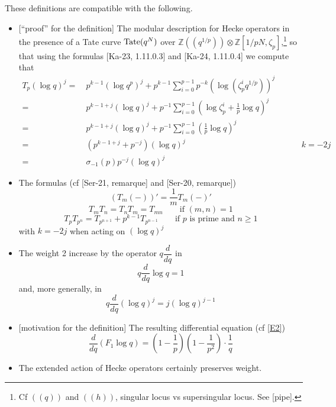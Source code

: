\documentclass{rs}
\theoremstyle{definition}
\theoremstyle{remark}
\newcommand{\mb}[1]{\mathbb{#1}}
\newcommand{\BZ}{{\mb Z}}
\newcommand{\si}{\sigma}
\newcommand{\lp}{(\!(}
\newcommand{\rp}{)\!)}
\renewcommand{\=}{\approx}
\renewcommand{\-}{\sim}
\newcommand{\Tate}{{\rm Tate}}
\numberwithin{equation}{section}
\numberwithin{thm}{section}
\begin{document}
These definitions are compatible with the following.  
\begin{itemize}
 \item {[``proof'' for the definition]} The modular description for Hecke operators in the presence of a Tate curve 
 $\Tate(q^N)$ over $\BZ \lp q^{1 / p} \rp \otimes \BZ [1 / p N, \zeta_p]$,\footnote{Cf 
 $\lp q \rp$ and $\lp h \rp$, singular locus vs supersingular locus.  See [pipe].  } 
 so that using the formulas [Ka-23, 1.11.0.3] and [Ka-24, 1.11.0.4] we compute that 
 \begin{equation*}
  \begin{split}
   T_p (\log q)^j = & ~ p^{k - 1} (\log q^p)^j + p^{k - 1} \sum_{i=0}^{p-1} p^{-k} \left( \log(\zeta_p^i q^{1/p}) \right)^j \\
                  = & ~ p^{k - 1 + j} (\log q)^j + p^{-1} \sum_{i=0}^{p-1} \left( \log \zeta_p^i + \frac{1}{p} \log q \right)^j \\
                  = & ~ p^{k - 1 + j} (\log q)^j + p^{-1} \sum_{i=0}^{p-1} \left( \frac{1}{p} \log q \right)^j \\
                  = & ~ (p^{k - 1 + j} + p^{-j}) (\log q)^j \qquad\qquad\qquad\qquad\qquad\qquad\qquad k = -2 j \\
                  = & ~ \si_{-1}(p) p^{-j} (\log q)^j 
  \end{split}
 \end{equation*}

 \item The formulas (cf [Ser-21, remarque] and [Ser-20, remarque]) 
 \[
  (T_m (-))' = \dfrac{1}{m} T_m (-)' 
 \]
 \[
  T_m T_n = T_n T_m = T_{m n} \qquad \text{if $(m,n) = 1$} 
 \]
 \[
  T_p T_{p^n} = T_{p^{n+1}} + p^{k-1} T_{p^{n-1}} \qquad \text{if $p$ is prime and $n \geq 1$} 
 \]
 with $k = -2 j$ when acting on $(\log q)^j$ 

 \item The weight 2 increase by the operator $q \dfrac{d}{dq}$ in 
 \[
  q \frac{d}{dq} \log q = 1 
 \]
 and, more generally, in 
 \[
  q \frac{d}{dq} (\log q)^j = j (\log q)^{j - 1} 
 \]

 \item {[motivation for the definition]} The resulting differential equation (cf \eqref{E2}) 
 \[
  \frac{d}{dq} (F_1 \log q) = (1 - \frac{1}{p}) (1 - \frac{1}{p^2}) \cdot \frac{1}{q} 
 \]

 \item The extended action of Hecke operators certainly preserves weight.  
\end{itemize}
\end{document}
